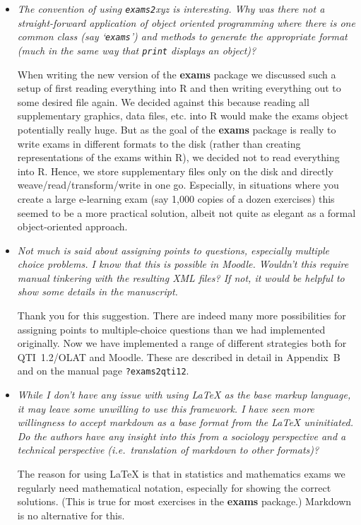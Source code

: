 \documentclass[american]{uibkletter}
\begin{document}
\begin{itemize}

\item {\it
The convention of using \texttt{exams2}xyz is interesting. Why was there not a
straight-forward application of object oriented programming where there is
one common class (say `\texttt{exams}') and methods to generate the appropriate
format (much in the same way that \texttt{print} displays an object)?}

When writing the new version of the \textbf{exams} package we discussed such a setup
of first reading everything into R and then writing everything out to some
desired file again. We decided against this because reading all supplementary
graphics, data files, etc. into R would make the exams object potentially
really huge. But as the goal of the \textbf{exams} package is really to write exams
in different formats to the disk (rather than creating representations of the
exams within R), we decided not to read everything into R. Hence, we store
supplementary files only on the disk and directly weave/read/transform/write
in one go. Especially, in situations where you create a large e-learning exam
(say 1,000 copies of a dozen exercises) this seemed to be a more practical
solution, albeit not quite as elegant as a formal object-oriented approach.
 
\item {\it
Not much is said about assigning points to questions, especially
multiple choice problems. I know that this is possible in Moodle. Wouldn't
this require manual tinkering with the resulting XML files? If not, it
would be helpful to show some details in the manuscript.}

Thank you for this suggestion. There are indeed many more possibilities
for assigning points to multiple-choice questions than we had implemented
originally. Now we have implemented a range of different strategies
both for QTI~1.2/OLAT and Moodle. These are described in detail in
Appendix~B and on the manual page \verb|?exams2qti12|.


\item {\it
While I don't have any issue with using {\LaTeX} as the base markup
language, it may leave some unwilling to use this framework. I have seen
more willingness to accept markdown as a base format from the {\LaTeX}
uninitiated. Do the authors have any insight into this from a sociology
perspective and a technical perspective (i.e.\ translation of markdown to
other formats)?}

The reason for using {\LaTeX} is that in statistics and mathematics exams we
regularly need mathematical notation, especially for showing the correct
solutions. (This is true for most exercises in the \textbf{exams} package.)
Markdown is no alternative for this.


\end{itemize}
\end{document}
